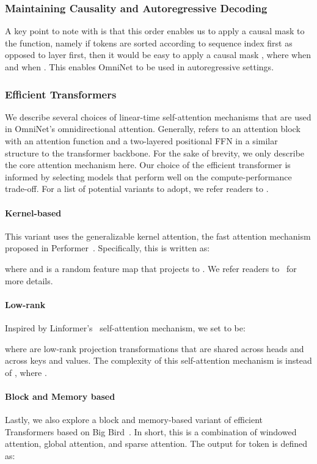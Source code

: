 \documentclass{article}
\begin{document}
\subsubsection{Maintaining Causality and Autoregressive Decoding}
A key point to note with  is that this order enables us to apply a causal mask to the  function, namely if tokens are sorted according to sequence index first as opposed to layer first, then it would be easy to apply a causal mask , where  when  and  when . This enables OmniNet to be used in autoregressive settings. 

\subsubsection{Efficient Transformers}
We describe several choices of linear-time self-attention mechanisms that are used in OmniNet's omnidirectional attention. Generally,  refers to an attention block with an attention function and a two-layered positional FFN in a similar structure to the transformer backbone. For the sake of brevity, we only describe the core attention mechanism here. Our choice of the efficient transformer is informed by \citep{tay2020long} selecting models that perform well on the compute-performance trade-off. For a list of potential variants to adopt, we refer readers to \citep{tay2020efficient}.
\vspace{-5pt}
\paragraph{Kernel-based} This variant uses the generalizable kernel attention, the fast attention mechanism proposed in Performer~\citep{choromanski2020rethinking}. Specifically, this is written as:

where  and  is a random feature map that projects  to . We refer readers to~\citep{choromanski2020rethinking} for more details.
\vspace{-5pt}
\paragraph{Low-rank} Inspired by Linformer's~\citep{wang2020linformer} self-attention mechanism, we set  to be:

where  are low-rank projection transformations that are shared across heads and across keys and values. The complexity of this self-attention mechanism is  instead of , where .
\vspace{-5pt}
\paragraph{Block and Memory based}
Lastly, we also explore a block and memory-based variant of efficient Transformers based on Big Bird~\citep{zaheer2020big}. In short, this is a combination of windowed attention, global attention, and sparse attention. The output for token  is defined as:
\end{document}
